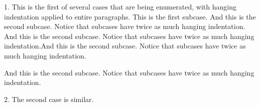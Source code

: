 \item{1.} This is the first of several cases that are being
enumerated, with hanging indentation applied to entire paragraphs.
 This is the first subcase.
 And this is the second subcase. Notice
that subcases have twice as much hanging indentation.
And this is the second subcase. Notice
that subcases have twice as much hanging indentation.And this is the second subcase. Notice
that subcases have twice as much hanging indentation.

\itemitem{} And this is the second subcase. Notice
that subcases have twice as much hanging indentation.
\item{2.} The second case is similar.


\bye

